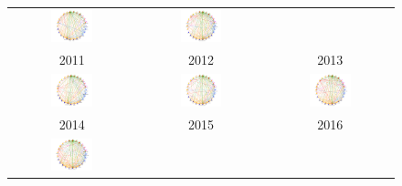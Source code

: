 \begin{figure}[H]
\begin{tabular}{ccc}
		\includegraphics[width=0.35\textwidth]{Imagens/rede-agr-br-2012.pdf} &   \includegraphics[width=0.35\textwidth]{Imagens/rede-agr-br-2013.pdf} \\
		2011 & 2012 & 2013\\[6pt]
		\includegraphics[width=0.35\textwidth]{Imagens/rede-agr-br-2014.pdf} &
		\includegraphics[width=0.35\textwidth]{Imagens/rede-agr-br-2015.pdf} &
		\includegraphics[width=0.35\textwidth]{Imagens/rede-agr-br-2016.pdf} \\
		2014 & 2015 & 2016\\[6pt]  \includegraphics[width=0.35\textwidth]{Imagens/rede-agr-br-2017.pdf} & & \\

\end{tabular}
\end{figure}
